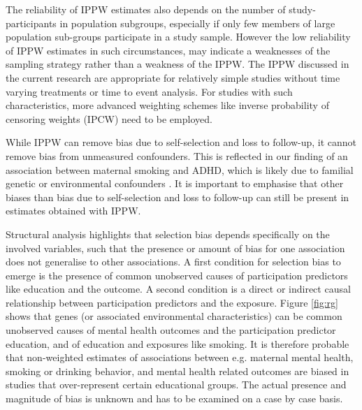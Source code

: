 \documentclass[12pt]{article}
\begin{document}
The reliability of IPPW estimates also depends on the number of study-participants in population subgroups, especially if only few members of large population sub-groups participate in a study sample. However the low reliability of IPPW estimates in such circumstances, may indicate a weaknesses of the sampling strategy rather than a weakness of the IPPW.
The IPPW discussed in the current research are appropriate for relatively simple studies without time varying treatments or time to event analysis. For studies with such characteristics, more advanced weighting schemes like inverse probability of censoring weights (IPCW\cite{Robins2000-fq}) need to be employed.

While IPPW can remove bias due to self-selection and loss to follow-up, it cannot remove bias from unmeasured confounders. This is reflected in our finding of an association between maternal smoking and ADHD, which is likely due to familial genetic or environmental confounders \cite{Donovan2011-me}. It is important to emphasise that other biases than bias due to self-selection and loss to follow-up can still be present in estimates obtained with IPPW.  

Structural analysis highlights that selection bias depends specifically on the involved variables, such that the presence or amount of bias for one association does not generalise to other associations. A first condition for selection bias to emerge is the presence of common unobserved causes of participation predictors like education and the outcome. A second condition is a direct or indirect causal relationship between participation predictors and the exposure. Figure \ref{fig:rg} shows that genes (or associated environmental characteristics) can be common unobserved causes of mental health outcomes and the participation predictor education, and of education and exposures like smoking. It is therefore probable that non-weighted estimates of associations between e.g. maternal mental health, smoking or drinking behavior, and mental health related outcomes are biased in studies that over-represent certain educational groups. The actual presence and magnitude of bias is unknown and has to be examined on a case by case basis. 
\end{document}
